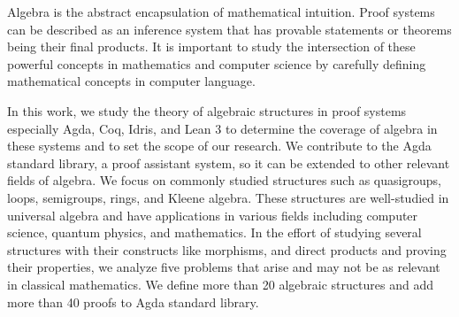 Algebra is the abstract encapsulation of mathematical intuition. Proof systems
can be described as an inference system that has provable statements or theorems
being their final products. It is important to study the intersection of these
powerful concepts in mathematics and computer science by carefully defining
mathematical concepts in computer language.

In this work, we study the theory of algebraic structures in proof systems especially Agda,
Coq, Idris, and Lean 3 to determine the coverage of algebra in these systems and
to set the scope of our research. We contribute to the Agda standard library, a
proof assistant system, so it can be extended to other relevant fields of
algebra. We focus on commonly studied structures such as quasigroups, loops,
semigroups, rings, and Kleene algebra. These structures are well-studied in
universal algebra and have applications in various fields including computer
science, quantum physics, and mathematics. In the effort of studying several
structures with their constructs like morphisms, and direct products and proving
their properties, we analyze five problems that arise and may not be as relevant
in classical mathematics. We define more than 20 algebraic structures and add
more than 40 proofs to Agda standard library.